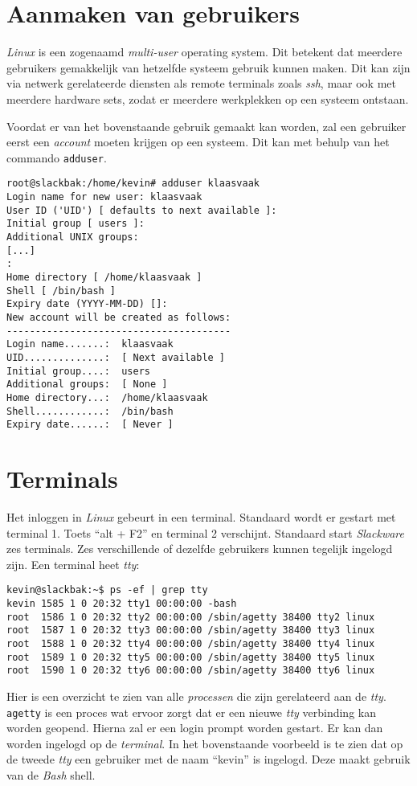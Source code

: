 \section{Aanmaken van gebruikers}
\emph{Linux} is een zogenaamd \emph{multi-user} operating system. Dit betekent dat meerdere gebruikers gemakkelijk van hetzelfde systeem gebruik kunnen maken. Dit kan zijn via netwerk gerelateerde diensten als remote terminals zoals \emph{ssh}, maar ook met meerdere hardware sets, zodat er meerdere werkplekken op een systeem ontstaan. 

Voordat er van het bovenstaande gebruik gemaakt kan worden, zal een gebruiker eerst een \emph{account} moeten krijgen op een systeem. Dit kan met behulp van het commando \texttt{adduser}.
\begin{lstlisting}
root@slackbak:/home/kevin# adduser klaasvaak
Login name for new user: klaasvaak
User ID ('UID') [ defaults to next available ]: 
Initial group [ users ]: 
Additional UNIX groups:
[...]
: 
Home directory [ /home/klaasvaak ] 
Shell [ /bin/bash ] 
Expiry date (YYYY-MM-DD) []: 
New account will be created as follows:
---------------------------------------
Login name.......:  klaasvaak
UID..............:  [ Next available ]
Initial group....:  users
Additional groups:  [ None ]
Home directory...:  /home/klaasvaak
Shell............:  /bin/bash
Expiry date......:  [ Never ]
\end{lstlisting}

\section{Terminals}
Het inloggen in \emph{Linux} gebeurt in een terminal. Standaard wordt er gestart met terminal 1. Toets ``alt + F2'' en terminal 2 verschijnt. Standaard start \emph{Slackware} zes terminals. Zes verschillende of dezelfde gebruikers kunnen tegelijk ingelogd zijn. Een terminal heet \emph{tty}:

\begin{lstlisting}
kevin@slackbak:~$ ps -ef | grep tty
kevin 1585 1 0 20:32 tty1 00:00:00 -bash
root  1586 1 0 20:32 tty2 00:00:00 /sbin/agetty 38400 tty2 linux
root  1587 1 0 20:32 tty3 00:00:00 /sbin/agetty 38400 tty3 linux
root  1588 1 0 20:32 tty4 00:00:00 /sbin/agetty 38400 tty4 linux
root  1589 1 0 20:32 tty5 00:00:00 /sbin/agetty 38400 tty5 linux
root  1590 1 0 20:32 tty6 00:00:00 /sbin/agetty 38400 tty6 linux
\end{lstlisting}%
Hier is een overzicht te zien van alle \emph{processen} die zijn gerelateerd aan de \emph{tty}. \texttt{agetty} is een proces wat ervoor zorgt dat er een nieuwe \emph{tty} verbinding kan worden geopend. Hierna zal er een login prompt worden gestart. Er kan dan worden ingelogd op de \emph{terminal}. In het bovenstaande voorbeeld is te zien dat op de tweede \emph{tty} een gebruiker met de naam ``kevin'' is ingelogd. Deze maakt gebruik van de \emph{Bash} shell. 

